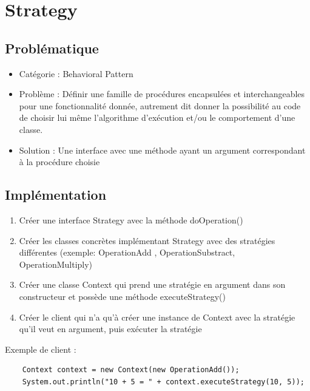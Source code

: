 \section{Strategy}
\subsection{Problématique}
\begin{itemize}
    \item Catégorie : Behavioral Pattern
    \item Problème : Définir une famille de procédures encapsulées et interchangeables pour une fonctionnalité donnée, autrement dit donner la possibilité au code de choisir lui même l'algorithme d'exécution et/ou le comportement d'une classe.
    \item Solution : Une interface avec une méthode ayant un argument correspondant à la procédure choisie
\end{itemize}
\subsection{Implémentation}
\begin{enumerate}
    \item Créer une interface Strategy avec la méthode doOperation()
    \item Créer les classes concrètes implémentant Strategy avec des stratégies différentes (exemple: OperationAdd , OperationSubstract, OperationMultiply)
    \item Créer une classe Context qui prend une stratégie en argument dans son constructeur et possède une méthode executeStrategy()
    \item Créer le client qui n’a qu’à créer une instance de Context avec la stratégie qu’il veut en argument, puis exécuter la stratégie 

\end{enumerate}
Exemple de client : 
\begin{lstlisting}
    Context context = new Context(new OperationAdd());		
    System.out.println("10 + 5 = " + context.executeStrategy(10, 5));
\end{lstlisting}


